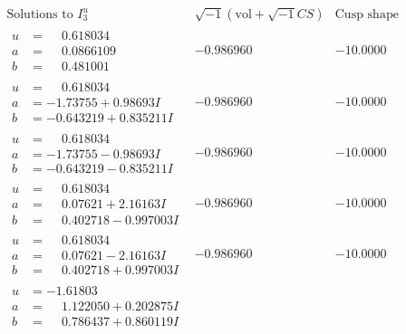 \documentclass[1p]{elsarticle_modified}
\theoremstyle{definition}
\newcommand{\I}{\sqrt{-1}}
\begin{document}
$$\begin{array}{c|c|c}  
\text{Solutions to }I^u_{3}& \I (\text{vol} + \sqrt{-1}CS) & \text{Cusp shape}\\
 \hline 
\begin{aligned}
u &= \phantom{-}0.618034\phantom{ +0.000000I} \\
a &= \phantom{-}0.0866109\phantom{ +0.000000I} \\
b &= \phantom{-}0.481001\phantom{ +0.000000I}\end{aligned}
 & -0.986960\phantom{ +0.000000I} & -10.0000\phantom{ +0.000000I} \\ \hline\begin{aligned}
u &= \phantom{-}0.618034\phantom{ +0.000000I} \\
a &= -1.73755 + 0.98693 I \\
b &= -0.643219 + 0.835211 I\end{aligned}
 & -0.986960\phantom{ +0.000000I} & -10.0000\phantom{ +0.000000I} \\ \hline\begin{aligned}
u &= \phantom{-}0.618034\phantom{ +0.000000I} \\
a &= -1.73755 - 0.98693 I \\
b &= -0.643219 - 0.835211 I\end{aligned}
 & -0.986960\phantom{ +0.000000I} & -10.0000\phantom{ +0.000000I} \\ \hline\begin{aligned}
u &= \phantom{-}0.618034\phantom{ +0.000000I} \\
a &= \phantom{-}0.07621 + 2.16163 I \\
b &= \phantom{-}0.402718 - 0.997003 I\end{aligned}
 & -0.986960\phantom{ +0.000000I} & -10.0000\phantom{ +0.000000I} \\ \hline\begin{aligned}
u &= \phantom{-}0.618034\phantom{ +0.000000I} \\
a &= \phantom{-}0.07621 - 2.16163 I \\
b &= \phantom{-}0.402718 + 0.997003 I\end{aligned}
 & -0.986960\phantom{ +0.000000I} & -10.0000\phantom{ +0.000000I} \\ \hline\begin{aligned}
u &= -1.61803\phantom{ +0.000000I} \\
a &= \phantom{-}1.122050 + 0.202875 I \\
b &= \phantom{-}0.786437 + 0.860119 I\end{aligned}

\end{array}$$
\end{document}

